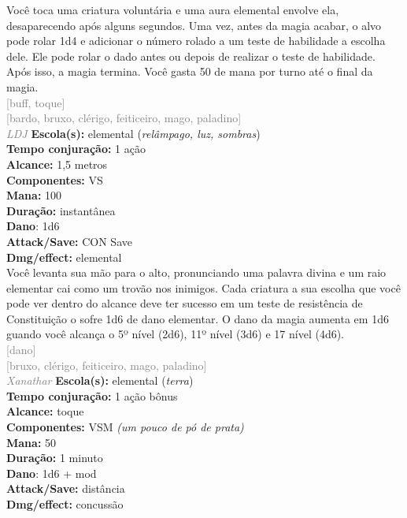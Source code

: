 \documentclass{RPG_Adventure}[2021/10/20]
\begin{document}
{\normalsize Você toca uma criatura voluntária e uma aura elemental envolve ela, desaparecendo após alguns segundos. Uma vez, antes da magia acabar, o alvo pode rolar 1d4 e adicionar o número rolado a um teste de habilidade a escolha dele. Ele pode rolar o dado antes ou depois de realizar o teste de habilidade. Após isso, a magia termina. Você gasta 50 de mana por turno até o final da magia.\\}
{\scriptsize \textcolor{gray}{[buff, toque]\\}}
{\scriptsize \textcolor{gray}{[bardo, bruxo, clérigo, feiticeiro, mago, paladino]\\}}
{\tiny \textcolor{gray}{\textit{LDJ}}}
{\small \t \textbf{Escola(s):} elemental (\textit{relâmpago, luz, sombras})\\\t \textbf{Tempo conjuração:} 1 ação\\\t \textbf{Alcance:} 1,5 metros\\\t \textbf{Componentes:} VS\\\t \textbf{Mana:} 100\\\t \textbf{Duração:} instantânea\\\t \textbf{Dano}: 1d6\\\t \textbf{Attack/Save:} CON Save\\\t \textbf{Dmg/effect:} elemental\\}
{\normalsize Você levanta sua mão para o alto, pronunciando uma palavra divina e um raio elementar cai como um trovão nos inimigos. Cada criatura a sua escolha que você pode ver dentro do alcance deve ter sucesso em um teste de resistência de Constituição o sofre 1d6 de dano elementar. O dano da magia aumenta em 1d6 guando você alcança o 5º nível (2d6), 11º nível (3d6) e 17 nível (4d6).\\}
{\scriptsize \textcolor{gray}{[dano]\\}}
{\scriptsize \textcolor{gray}{[bruxo, clérigo, feiticeiro, mago, paladino]\\}}
{\tiny \textcolor{gray}{\textit{Xanathar}}}
{\small \t \textbf{Escola(s):} elemental (\textit{terra})\\\t \textbf{Tempo conjuração:} 1 ação bônus\\\t \textbf{Alcance:} toque\\\t \textbf{Componentes:} VSM \textit{(um pouco de pó de prata)}\\\t \textbf{Mana:} 50\\\t \textbf{Duração:} 1 minuto\\\t \textbf{Dano}: 1d6 + mod\\\t \textbf{Attack/Save:} distância\\\t \textbf{Dmg/effect:} concussão\\}
\end{document}
